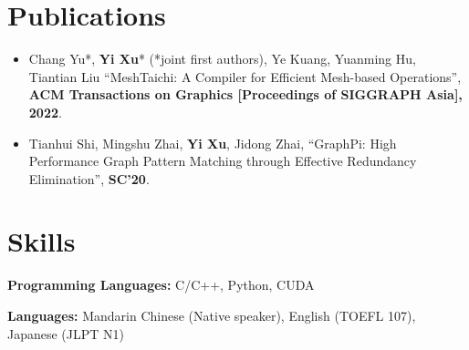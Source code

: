 \documentclass{resume}
\begin{document}
\section{Publications}
\begin{itemize}
  \item Chang Yu*, \textbf{Yi Xu}* (*joint first authors), Ye Kuang, Yuanming Hu, Tiantian Liu   
  ``MeshTaichi: A Compiler for Efficient Mesh-based Operations'', 
  \textbf{ACM Transactions on Graphics [Proceedings of SIGGRAPH Asia], 2022}.

	
  \item Tianhui Shi, Mingshu Zhai, \textbf{Yi Xu}, Jidong Zhai, 
  ``GraphPi: High Performance Graph Pattern Matching through Effective Redundancy Elimination'', 
  \textbf{SC'20}.
\end{itemize}

\section{Skills}
\textbf{Programming Languages:} \small C/C++, Python, CUDA %

\textbf{Languages:} \small Mandarin Chinese (Native speaker), English (TOEFL 107), Japanese (JLPT N1)

%
%
\end{document}
